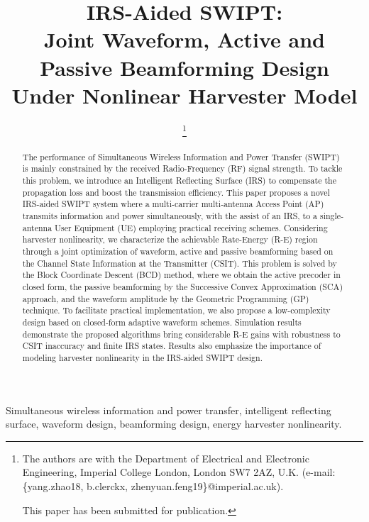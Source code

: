 \documentclass[journal]{IEEEtran}
\begin{document}
	\title{IRS-Aided SWIPT:\\Joint Waveform, Active and Passive Beamforming Design Under Nonlinear Harvester Model}
	\author{
		\thanks{
			The authors are with the Department of Electrical and Electronic Engineering, Imperial College London, London SW7 2AZ, U.K. (e-mail: \{yang.zhao18, b.clerckx, zhenyuan.feng19\}@imperial.ac.uk).

			This paper has been submitted for publication.
		}
	}
	\maketitle


	\begin{abstract}
		The performance of Simultaneous Wireless Information and Power Transfer (SWIPT) is mainly constrained by the received Radio-Frequency (RF) signal strength. To tackle this problem, we introduce an Intelligent Reflecting Surface (IRS) to compensate the propagation loss and boost the transmission efficiency. This paper proposes a novel IRS-aided SWIPT system where a multi-carrier multi-antenna Access Point (AP) transmits information and power simultaneously, with the assist of an IRS, to a single-antenna User Equipment (UE) employing practical receiving schemes. Considering harvester nonlinearity, we characterize the achievable Rate-Energy (R-E) region through a joint optimization of waveform, active and passive beamforming based on the Channel State Information at the Transmitter (CSIT). This problem is solved by the Block Coordinate Descent (BCD) method, where we obtain the active precoder in closed form, the passive beamforming by the Successive Convex Approximation (SCA) approach, and the waveform amplitude by the Geometric Programming (GP) technique. To facilitate practical implementation, we also propose a low-complexity design based on closed-form adaptive waveform schemes. Simulation results demonstrate the proposed algorithms bring considerable R-E gains with robustness to CSIT inaccuracy and finite IRS states. Results also emphasize the importance of modeling harvester nonlinearity in the IRS-aided SWIPT design.
	\end{abstract}


	\begin{IEEEkeywords}
		Simultaneous wireless information and power transfer, intelligent reflecting surface, waveform design, beamforming design, energy harvester nonlinearity.
	\end{IEEEkeywords}
\end{document}
